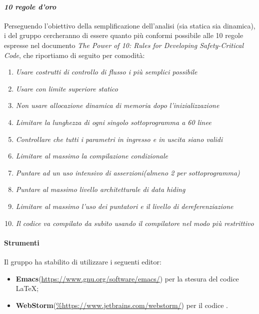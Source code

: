 		\paragraph*{\textit{10 regole d'oro}}
		Perseguendo l'obiettivo della semplificazione dell'analisi (sia statica sia dinamica),
           	i  del gruppo cercheranno di essere quanto più conformi possibile alle 10 regole
           	espresse nel documento \textit{The Power of 10: Rules for Developing Safety-Critical Code}, che riportiamo di seguito per comodità:
                	\begin{enumerate}
                        	\item \textit{Usare costrutti di controllo di flusso i più semplici possibile}
                        	\item \textit{Usare  con limite superiore statico}
                        	\item \textit{Non usare allocazione dinamica di memoria dopo l'inizializzazione}
                        	\item \textit{Limitare la lunghezza di ogni singolo sottoprogramma a 60 linee}
                        	\item \textit{Controllare che tutti i parametri in ingresso e in uscita siano validi}
                        	\item \textit{Limitare al massimo la compilazione condizionale}
                        	\item \textit{Puntare ad un uso intensivo di asserzioni(almeno 2 per sottoprogramma)}
                        	\item \textit{Puntare al massimo livello architetturale di \textit{data hiding}}
                        	\item \textit{Limitare al massimo l'uso dei puntatori e il livello di dereferenziazione}
                        	\item \textit{Il codice va compilato da subito usando il compilatore nel modo più restrittivo}
			\end{enumerate}

                \paragraph*{Strumenti}
                Il gruppo ha stabilito di utilizzare i seguenti editor:
                \begin{itemize}
                  \item \textbf{Emacs}(\url{https://www.gnu.org/software/emacs/}) per la stesura del codice \LaTeX; 
                  \item \textbf{WebStorm}(\url{%https://www.jetbrains.com/webstorm/}) per il codice \glossaryItem{Javascript}.      
                \end{itemize}
